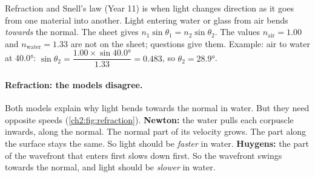 \begin{refresher}{Refraction and Snell's law (Year 11)}
 is when light changes direction as it goes from one material into
another. Light entering water or glass from air bends \emph{towards} the normal. The sheet
gives $n_1\sin\theta_1 = n_2\sin\theta_2$. The values $n_\mathrm{air} = 1.00$ and
$n_\mathrm{water} = 1.33$ are not on the sheet; questions give them. Example: air to water
at \ang{40.0}: $\sin\theta_2 = \dfrac{1.00 \times \sin\ang{40.0}}{1.33} = 0.483$, so
$\theta_2 = \ang{28.9}$.
\end{refresher}

\paragraph{Refraction: the models disagree.} Both models explain why light bends towards
the normal in water. But they need opposite speeds (\cref{ch2:fig:refraction}).
\textbf{Newton:} the water pulls each corpuscle inwards, along the normal. The normal
part of its velocity grows. The part along the surface stays the same. So light should
be \emph{faster} in water. \textbf{Huygens:} the part of the wavefront that enters first
slows down first. So the wavefront swings towards the normal, and light should be
\emph{slower} in water.

